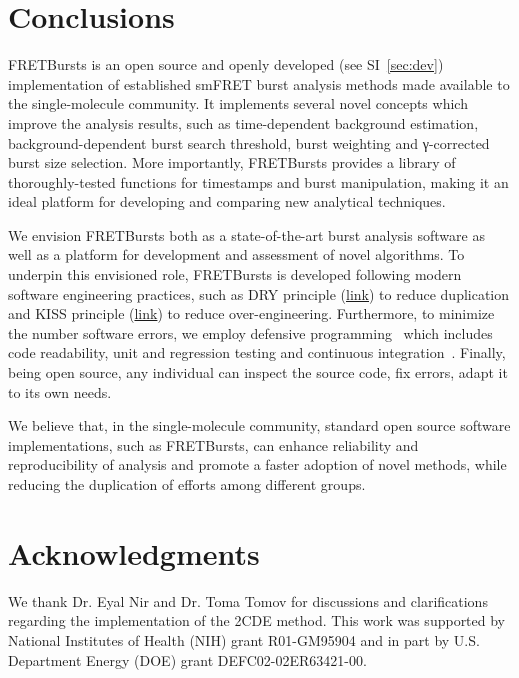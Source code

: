 \section{Conclusions}
\label{sec:conclusions}

FRETBursts is an open source and openly developed (see SI~\ref{sec:dev}) implementation 
of established smFRET burst analysis methods
made available to the single-molecule community.
It implements several novel concepts which improve the analysis results, such as
time-dependent background estimation, background-dependent burst search threshold,
burst weighting and γ-corrected burst size selection.
More importantly, FRETBursts provides a library of thoroughly-tested functions
for timestamps and burst manipulation, making it an ideal platform for
developing and comparing new analytical techniques.

We envision FRETBursts both as a state-of-the-art burst analysis
software as well as a platform for development and assessment of novel algorithms.
To underpin this envisioned role, FRETBursts is developed following modern 
software engineering practices, such as DRY principle
(\href{http://en.wikipedia.org/wiki/Don\%27t_repeat_yourself}{link})
to reduce duplication and KISS principle
(\href{http://en.wikipedia.org/wiki/KISS_principle}{link})
to reduce over-engineering. Furthermore, to minimize the number software errors,
we employ defensive programming~\cite{Prli__2012} which includes code readability,
unit and regression testing and continuous integration~\cite{Eglen_2016}.
Finally, being open source, any individual can inspect the source code,
fix errors, adapt it to its own needs.

We believe that, in the single-molecule community,
standard open source software implementations, such as FRETBursts, can enhance
reliability and reproducibility of analysis and promote a faster adoption of novel methods, 
while reducing the duplication of efforts among different groups.

\section*{Acknowledgments}
We thank Dr. Eyal Nir and Dr. Toma Tomov for discussions and clarifications regarding the 
implementation of the 2CDE method.
This work was supported by National Institutes of Health (NIH)
grant R01-GM95904 and in part by U.S. Department Energy (DOE) grant DEFC02-02ER63421-00.

